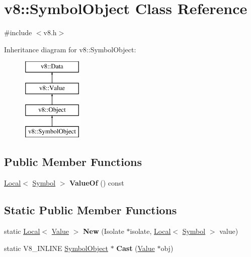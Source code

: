 \hypertarget{classv8_1_1SymbolObject}{}\section{v8\+:\+:Symbol\+Object Class Reference}
\label{classv8_1_1SymbolObject}


{\ttfamily \#include $<$v8.\+h$>$}

Inheritance diagram for v8\+:\+:Symbol\+Object\+:\begin{figure}[H]
\begin{center}
\leavevmode
\includegraphics[height=4.000000cm]{classv8_1_1SymbolObject}
\end{center}
\end{figure}
\subsection*{Public Member Functions}
\begin{DoxyCompactItemize}
\item 
\mbox{\label{classv8_1_1SymbolObject_abcf8fd3b5e34893571d45feb181f127d}} 
\mbox{\hyperlink{classv8_1_1Local}{Local}}$<$ \mbox{\hyperlink{classv8_1_1Symbol}{Symbol}} $>$ {\bfseries Value\+Of} () const
\end{DoxyCompactItemize}
\subsection*{Static Public Member Functions}
\begin{DoxyCompactItemize}
\item 
\mbox{\label{classv8_1_1SymbolObject_a41f75606c172da650ea61b173f15d4b1}} 
static \mbox{\hyperlink{classv8_1_1Local}{Local}}$<$ \mbox{\hyperlink{classv8_1_1Value}{Value}} $>$ {\bfseries New} (Isolate $\ast$isolate, \mbox{\hyperlink{classv8_1_1Local}{Local}}$<$ \mbox{\hyperlink{classv8_1_1Symbol}{Symbol}} $>$ value)
\item 
\mbox{\label{classv8_1_1SymbolObject_a03322931e62adfd4e5d184d15d5e4af9}} 
static V8\+\_\+\+I\+N\+L\+I\+NE \mbox{\hyperlink{classv8_1_1SymbolObject}{Symbol\+Object}} $\ast$ {\bfseries Cast} (\mbox{\hyperlink{classv8_1_1Value}{Value}} $\ast$obj)
\end{DoxyCompactItemize}


